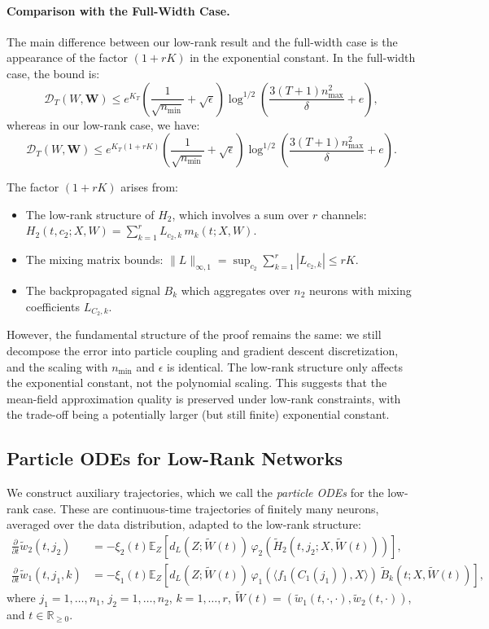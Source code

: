 \paragraph*{Comparison with the Full-Width Case.}
The main difference between our low-rank result and the full-width case \cite{nguyen2020global} is the appearance of the factor $(1+rK)$ in the exponential constant. In the full-width case, the bound is:
\[
\mathscr{D}_T(W, \mathbf{W}) \le e^{K_T}\left(\frac{1}{\sqrt{n_{\min}}} + \sqrt{\epsilon}\right)\log^{1/2}\left(\frac{3(T+1)n_{\max}^2}{\delta} + e\right),
\]
whereas in our low-rank case, we have:
\[
\mathscr{D}_T(W, \mathbf{W}) \le e^{K_T(1+rK)}\left(\frac{1}{\sqrt{n_{\min}}} + \sqrt{\epsilon}\right)\log^{1/2}\left(\frac{3(T+1)n_{\max}^2}{\delta} + e\right).
\]

The factor $(1+rK)$ arises from:
\begin{itemize}
\item The low-rank structure of $H_2$, which involves a sum over $r$ channels: $H_2(t, c_2; X, W) = \sum_{k=1}^r L_{c_2,k}\,m_k(t; X, W)$.
\item The mixing matrix bounds: $\|L\|_{\infty,1} = \sup_{c_2}\sum_{k=1}^r |L_{c_2,k}| \le rK$.
\item The backpropagated signal $B_k$ which aggregates over $n_2$ neurons with mixing coefficients $L_{C_2,k}$.
\end{itemize}

However, the fundamental structure of the proof remains the same: we still decompose the error into particle coupling and gradient descent discretization, and the scaling with $n_{\min}$ and $\epsilon$ is identical. The low-rank structure only affects the exponential constant, not the polynomial scaling. This suggests that the mean-field approximation quality is preserved under low-rank constraints, with the trade-off being a potentially larger (but still finite) exponential constant.

\subsection{Particle ODEs for Low-Rank Networks}

We construct auxiliary trajectories, which we call the \textit{particle ODEs} for the low-rank case. These are continuous-time trajectories of finitely many neurons, averaged over the data distribution, adapted to the low-rank structure:
\begin{align*}
\frac{\partial}{\partial t}\tilde{w}_2(t, j_2) &= -\xi_2(t)\mathbb{E}_Z\left[d_L(Z; \tilde{W}(t))\,\varphi_2(\tilde{H}_2(t, j_2; X, \tilde{W}(t)))\right],\\
\frac{\partial}{\partial t}\tilde{w}_1(t, j_1, k) &= -\xi_1(t)\mathbb{E}_Z\left[d_L(Z; \tilde{W}(t))\,\varphi_1(\langle f_1(C_1(j_1)), X\rangle)\,\tilde{B}_k(t; X, \tilde{W}(t))\right],
\end{align*}
where $j_1 = 1, \ldots, n_1$, $j_2 = 1, \ldots, n_2$, $k = 1, \ldots, r$, $\tilde{W}(t) = (\tilde{w}_1(t, \cdot, \cdot), \tilde{w}_2(t, \cdot))$, and $t \in \mathbb{R}_{\ge 0}$. 

